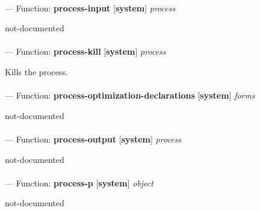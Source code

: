 \paragraph{}
\label{SYSTEM:PROCESS-INPUT}
--- Function: \textbf{process-input} [\textbf{system}] \textit{process}

\begin{adjustwidth}{5em}{5em}
not-documented
\end{adjustwidth}

\paragraph{}
\label{SYSTEM:PROCESS-KILL}
--- Function: \textbf{process-kill} [\textbf{system}] \textit{process}

\begin{adjustwidth}{5em}{5em}
Kills the process.
\end{adjustwidth}

\paragraph{}
\label{SYSTEM:PROCESS-OPTIMIZATION-DECLARATIONS}
--- Function: \textbf{process-optimization-declarations} [\textbf{system}] \textit{forms}

\begin{adjustwidth}{5em}{5em}
not-documented
\end{adjustwidth}

\paragraph{}
\label{SYSTEM:PROCESS-OUTPUT}
--- Function: \textbf{process-output} [\textbf{system}] \textit{process}

\begin{adjustwidth}{5em}{5em}
not-documented
\end{adjustwidth}

\paragraph{}
\label{SYSTEM:PROCESS-P}
--- Function: \textbf{process-p} [\textbf{system}] \textit{object}

\begin{adjustwidth}{5em}{5em}
not-documented
\end{adjustwidth}

